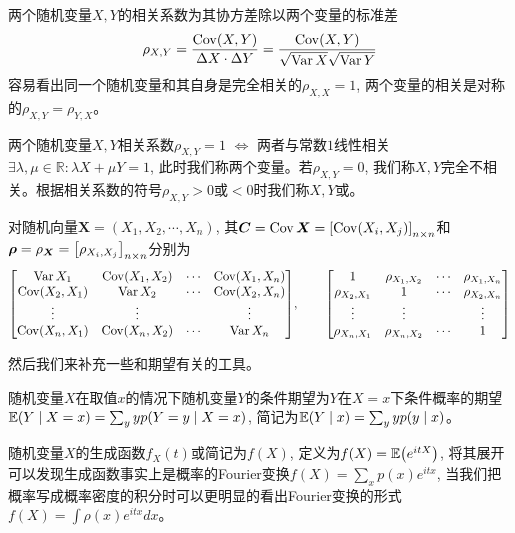 \begin{definition}[相关系数]
    两个随机变量$X,Y$的相关系数为其协方差除以两个变量的标准差
    $$\rho_{X,Y}=\frac{\operatorname{{\rm Cov}}(X,Y)}{\Delta X\cdot\Delta Y}=\frac{\operatorname{{\rm Cov}}(X,Y)}{\sqrt{\operatorname{{\rm Var}} X}\sqrt{\operatorname{{\rm Var}} Y}}$$
    容易看出同一个随机变量和其自身是完全相关的$\rho_{X,X}=1$, 两个变量的相关是对称的$\rho_{X,Y}=\rho_{Y,X}$。
\end{definition}
\begin{proposition}
    两个随机变量$X,Y$相关系数$\rho_{X,Y}=1$ $\Longleftrightarrow$ 两者与常数$1$线性相关$\exists\lambda,\mu\in\mathbb R:\lambda X+\mu Y=1$, 此时我们称两个变量。若$\rho_{X,Y}=0$, 我们称$X,Y$完全不相关。根据相关系数的符号$\rho_{X,Y}>0$或$<0$时我们称$X,Y$或。
\end{proposition}
\begin{definition}
    对随机向量$\bm X=(X_1,X_2,\cdots,X_n)$, 其$\bm C=\operatorname{{\rm Cov}}\bm X=\qty[\operatorname{{\rm Cov}}(X_i,X_j)]_{n\times n}$和$\bm\rho=\rho_{\bm X}=\qty[\rho_{X_i,X_j}]_{n\times n}$分别为
    $$\mqty[
        \Var X_1 & \Cov(X_1, X_2) & \cdots & \Cov(X_1, X_n)\\
        \Cov(X_2, X_1) & \Var X_2 & \cdots & \Cov(X_2, X_n)\\
        \vdots & \vdots &  & \vdots\\
        \Cov(X_n, X_1) & \Cov(X_n, X_2) & \cdots & \Var X_n
    ],\qquad \mqty[
        1 & \rho_{X_1, X_2} & \cdots & \rho_{X_1, X_n}\\
        \rho_{X_2, X_1} & 1 & \cdots & \rho_{X_2, X_n}\\
        \vdots & \vdots &  & \vdots\\
        \rho_{X_n, X_1} & \rho_{X_n, X_2} & \cdots & 1\\
    ]$$
\end{definition}
\par 然后我们来补充一些和期望有关的工具。
\begin{definition}[条件期望]
    随机变量$X$在取值$x$的情况下随机变量$Y$的条件期望为$Y$在$X=x$下条件概率的期望$\mathbb{E}(Y\mid X=x)=\sum_{y}yp(Y=y\mid X=x)$, 简记为$\mathbb{E}(Y\mid x)=\sum_y yp(y\mid x)$。
\end{definition}
\begin{definition}[生成函数]
    随机变量$X$的生成函数$f_X(t)$或简记为$f(X)$, 定义为$f(X)=\mathbb{E}\qty(e^{itX})$, 将其展开可以发现生成函数事实上是概率的Fourier变换$f(X)=\sum_x p(x)e^{itx}$, 当我们把概率写成概率密度的积分时可以更明显的看出Fourier变换的形式$f(X)=\int \rho(x)e^{itx}dx$。
\end{definition}
